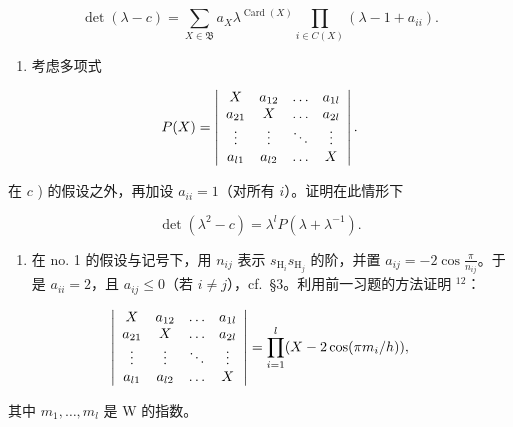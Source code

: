 \[
\det (\lambda - c) = \sum_ {X \in \mathfrak {B}} a _ {X} \lambda^ {\operatorname{Card} (X)} \prod_ {i \in C (X)} (\lambda - 1 + a _ {i i}).
\]

\begin{enumerate}
\def\labelenumi{\alph{enumi})}
\setcounter{enumi}{3}
\tightlist
\item
  考虑多项式
\end{enumerate}

\[
P (X) = \left| \begin{array}{c c c c} X & a _ {1 2} & \ldots & a _ {1 l} \\ a _ {2 1} & X & \ldots & a _ {2 l} \\ \vdots & \vdots & \ddots & \vdots \\ a _ {l 1} & a _ {l 2} & \ldots & X \end{array} \right|.
\]

在 \(c\) ) 的假设之外，再加设 \(a_{ii} = 1\)（对所有 \(i\)）。证明在此情形下

\[
\det (\lambda^ {2} - c) = \lambda^ {l} P (\lambda + \lambda^ {- 1}).
\]

\begin{enumerate}
\def\labelenumi{\arabic{enumi})}
\setcounter{enumi}{3}
\tightlist
\item
  在 no. 1 的假设与记号下，用 \(n_{ij}\) 表示 \(s_{\mathrm{H}_i}s_{\mathrm{H}_j}\) 的阶，并置 \(a_{ij} = -2\cos \frac{\pi}{n_{ij}}\)。于是 \(a_{ii} = 2\)，且 \(a_{ij} \leqslant 0\)（若 \(i \neq j\)），cf.~§3。利用前一习题的方法证明 \(^{12}\)：
\end{enumerate}

\[
\left| \begin{array}{c c c c} X & a _ {1 2} & \ldots & a _ {1 l} \\ a _ {2 1} & X & \ldots & a _ {2 l} \\ \vdots & \vdots & \ddots & \vdots \\ a _ {l 1} & a _ {l 2} & \ldots & X \end{array} \right| = \prod_ {i = 1} ^ {l} (X - 2 \cos (\pi m _ {i} / h)),
\]

其中 \(m_{1},\ldots ,m_{l}\) 是 W 的指数。

